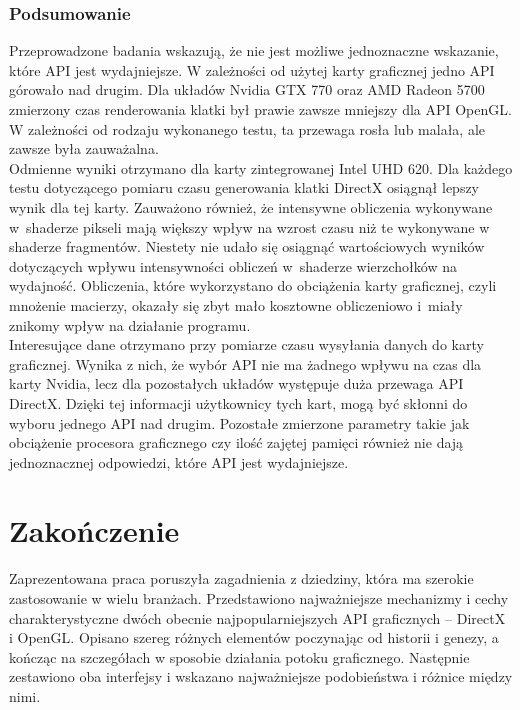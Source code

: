 \documentclass[archive]{mgr}
\begin{document}
\subsection{Podsumowanie}

Przeprowadzone badania wskazują, że nie jest możliwe jednoznaczne wskazanie, które API jest wydajniejsze. W zależności od użytej karty graficznej jedno API górowało nad drugim. Dla układów Nvidia GTX 770 oraz AMD Radeon 5700 zmierzony czas renderowania klatki był prawie zawsze mniejszy dla API OpenGL. W zależności od rodzaju wykonanego testu, ta przewaga rosła lub malała, ale zawsze była zauważalna.\\

Odmienne wyniki otrzymano dla karty zintegrowanej Intel UHD 620. Dla każdego testu dotyczącego pomiaru czasu generowania klatki DirectX osiągnął lepszy wynik dla tej karty. Zauważono również, że intensywne obliczenia wykonywane w~shaderze pikseli mają większy wpływ na wzrost czasu niż te wykonywane w shaderze fragmentów. Niestety nie udało się osiągnąć wartościowych wyników dotyczących wpływu intensywności obliczeń w~shaderze wierzchołków na wydajność. Obliczenia, które wykorzystano do obciążenia karty graficznej, czyli mnożenie macierzy, okazały się zbyt mało kosztowne obliczeniowo i~miały znikomy wpływ na działanie programu.\\

Interesujące dane otrzymano przy pomiarze czasu wysyłania danych do karty graficznej. Wynika z nich, że wybór API nie ma żadnego wpływu na czas dla karty Nvidia, lecz dla pozostałych układów występuje duża przewaga API DirectX. Dzięki tej informacji użytkownicy tych kart, mogą być skłonni do wyboru jednego API nad drugim. Pozostałe zmierzone parametry takie jak obciążenie procesora graficznego czy ilość zajętej pamięci również nie dają jednoznacznej odpowiedzi, które API jest wydajniejsze.

\chapter{Zakończenie}


Zaprezentowana praca poruszyła zagadnienia z dziedziny, która ma szerokie zastosowanie w wielu branżach. Przedstawiono najważniejsze mechanizmy i cechy charakterystyczne dwóch obecnie najpopularniejszych API graficznych – DirectX i OpenGL. Opisano szereg różnych elementów poczynając od historii i genezy, a kończąc na szczegółach w sposobie działania potoku graficznego. Następnie zestawiono oba interfejsy i wskazano najważniejsze podobieństwa i różnice między nimi.\\
\end{document}
